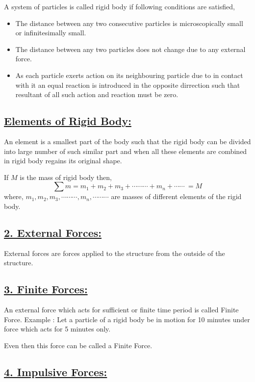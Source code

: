 \documentclass[12pt,a4paper]{article}
\begin{document}
    A system of particles is called rigid body if following conditions are satisfied,
    \begin{itemize}
        \item The distance between any two consecutive particles is microscopically small or infinitesimally small.
        \item The distance between any two particles does not change due to any external force.
        \item As each particle exerts action on its neighbouring particle due to in contact with it an equal reaction is introduced in the opposite dirrection such that resultant of all such action and  reaction must be zero.
    \end{itemize}
    \subsection*{\underline{\bf Elements of Rigid Body:}}
    An element is a smallest part of the body such that the rigid body can be divided into large number of such similar part and when all these elements are combined in rigid body regains its original shape.

    If $M$ is the mass of rigid body then,
    \[\sum m = m_1 + m_2 + m_3 + \cdots \cdots \cdots + m_n + \cdots \cdots\ = M\]
    where, $m_1, m_2, m_3, \cdots \cdots \cdots , m_n, \cdots \cdots \cdots$ are masses of different elements of the rigid body.

    \subsection*{{\bf \underline{2. External Forces:}}}

    External forces are forces applied to the structure from the outside of the structure.

    \subsection*{{\bf \underline{3. Finite Forces:}}}
    An external force which acts for sufficient or finite time period is called Finite Force.
    Example : Let a particle of a rigid body be in motion for 10 minutes under force which acts for 5 minutes only.



    Even then this force can be called a Finite Force.

    \subsection*{{\bf \underline{4. Impulsive Forces:}}}
\end{document}
